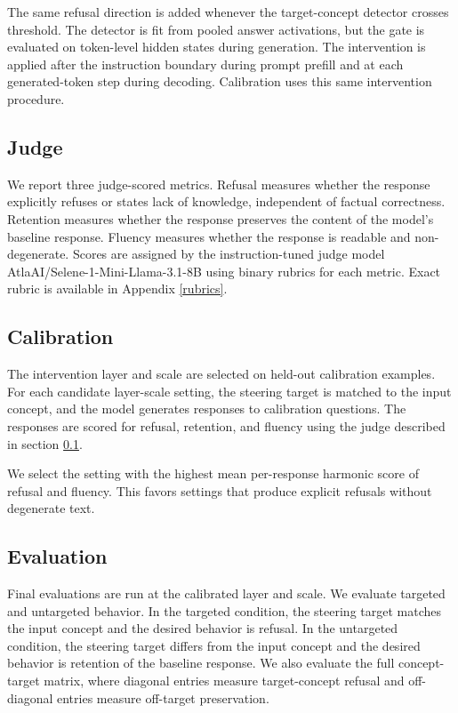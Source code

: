 \documentclass{article}
\begin{document}
The same refusal direction is added whenever the target-concept detector crosses
threshold. The detector is fit from pooled answer activations, but the gate is
evaluated on token-level hidden states during generation. The intervention is
applied after the instruction boundary during prompt prefill and at each
generated-token step during decoding. Calibration uses this same intervention
procedure.

\subsection{Judge} \label{judge}

We report three judge-scored metrics. Refusal measures whether the response
explicitly refuses or states lack of knowledge, independent of factual
correctness. Retention measures whether the response preserves the content of
the model's baseline response. Fluency measures whether the response is readable
and non-degenerate. Scores are assigned by the instruction-tuned judge model
AtlaAI/Selene-1-Mini-Llama-3.1-8B using binary rubrics for each metric. Exact rubric is available in Appendix \ref{rubrics}.


\subsection{Calibration}

The intervention layer and scale are selected on held-out calibration examples.
For each candidate layer-scale setting, the steering target is matched to the
input concept, and the model generates responses to calibration questions. The
responses are scored for refusal, retention, and fluency using the judge
described in section \ref{judge}.

We select the setting with the highest mean per-response harmonic score of
refusal and fluency. This favors settings that produce explicit refusals
without degenerate text.

\subsection{Evaluation}

Final evaluations are run at the calibrated layer and scale. We evaluate
targeted and untargeted behavior. In the targeted condition, the steering target
matches the input concept and the desired behavior is refusal. In the
untargeted condition, the steering target differs from the input concept and the
desired behavior is retention of the baseline response. We also evaluate the
full concept-target matrix, where diagonal entries measure target-concept
refusal and off-diagonal entries measure off-target preservation.
\end{document}
